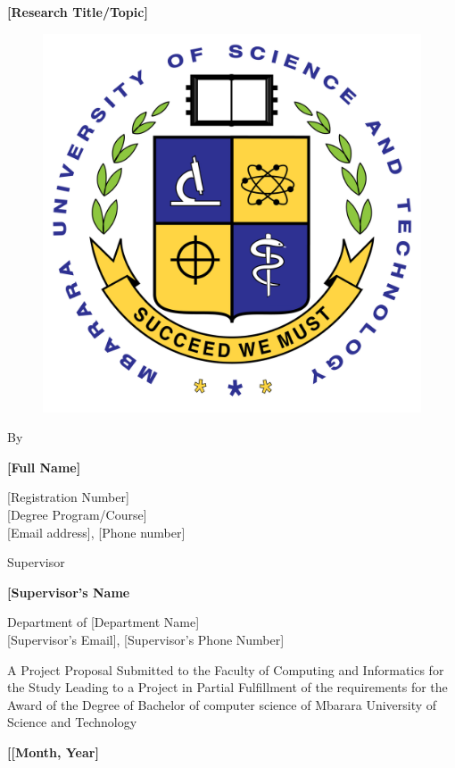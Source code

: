 
\thispagestyle{empty}%


\begin{center}
{\bf\LARGE [Research Title/Topic]}
\par\vspace{3mm}
\begin{figure}[H]
    \centering
    \includegraphics[width=.15\linewidth]{images/MUST-logo.png}
    \label{fig:2019cases}
\end{figure}
\par\vspace{2mm}

\par By

\par\vspace{4mm}

\par{\bf [Full Name]}

[Registration Number]\\

[Degree Program/Course]\\

[Email address], [Phone number]

\par\vspace{5mm}

Supervisor\\

\par{\bf [Supervisor's Name}

Department of [Department Name]\\

[Supervisor's Email], [Supervisor's Phone Number]

\par\vspace{10mm}
%
A Project Proposal Submitted to the Faculty of Computing and Informatics for
the Study Leading to a Project in Partial Fulfillment of the requirements for the
Award of the Degree of Bachelor of computer science of Mbarara University of
Science and Technology

\par\vspace{3mm}

\par\vspace{16mm}
\par {\bf [[Month, Year]}

\end{center}




